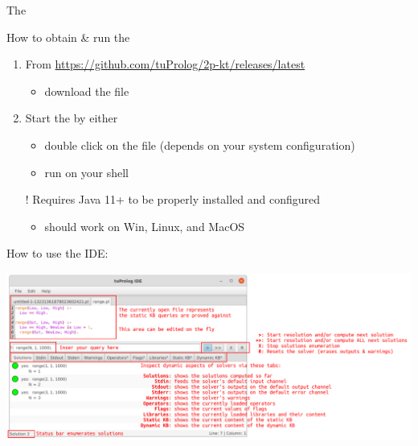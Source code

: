 \documentclass[handout]{beamer}
\begin{document}
\begin{frame}[allowframebreaks]{The }
    \begin{block}{How to obtain \& run the }
        \begin{enumerate}
            \item From \url{https://github.com/tuProlog/2p-kt/releases/latest}
            \begin{itemize}
                \item download the \alert{} file
            \end{itemize}

            \item Start the  by either
            \begin{itemize}
                \item double click on the file (depends on your system configuration)
                \item run  on your shell
            \end{itemize}

            \item[!] Requires Java 11+ to be properly installed and configured
            \begin{itemize}
                \item should work on Win, Linux, and MacOS
            \end{itemize} 
        \end{enumerate}
    \end{block}

    \framebreak

    How to use the IDE:
    \begin{center}
        \includegraphics[width=\linewidth]{img/ide-tutorial.pdf}
    \end{center}
\end{frame}
\end{document}
